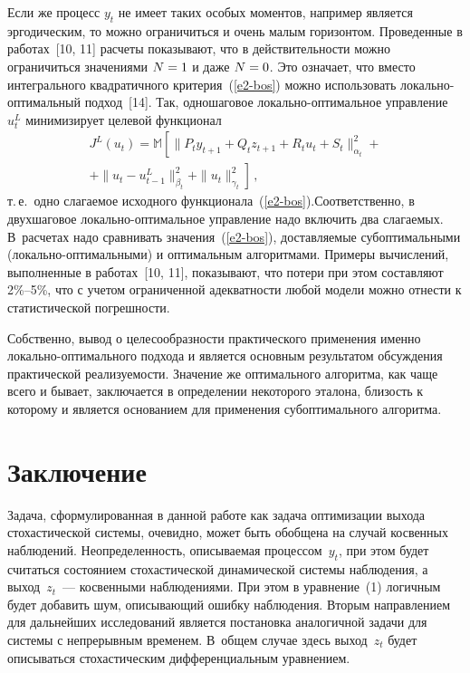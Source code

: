 \begin{multicols}{2}
 Если же процесс $y_t$ не имеет таких особых моментов, например
является эргодическим, то можно ограничиться и очень малым горизонтом.
Проведенные в работах~[10, 11] расчеты показывают, что в действительности
можно ограничиться значениями $N\hm=1$ и даже $N\hm=0$. Это означает,
что вместо интегрального квадратичного критерия~(\ref{e2-bos}) можно
использовать ло\-каль\-но-оп\-ти\-маль\-ный подход~[14]. Так, одношаговое
ло\-каль\-но-оп\-ти\-маль\-ное управление $u_t^L$ минимизирует целевой
функционал
 \begin{multline*}
 J^L(u_t) =\mathbb{M}\left[ \| P_t y_{t+1} +Q_t z_{t+1} +R_t u_t
+S_t\|^2_{\alpha_t} +{}\right.\\[9pt]
\left.{}+\| u_t- u^L_{t-1} \|^2_{\beta_t} +
\| u_t\|^2_{\gamma_t}\right]\,,
\end{multline*}
т.\,е.\ одно слагаемое исходного функционала~(\ref{e2-bos}).\linebreak Соответственно, в
двухшаговое ло\-каль\-но-оп\-ти\-маль\-ное управление надо включить два
сла\-га\-емых. В~расчетах надо сравнивать значения~(\ref{e2-bos}), до\-став\-ля\-емые
субоптимальными (ло\-каль\-но-оп\-ти\-маль\-ными) и оптимальным алгоритмами.
Примеры вы\-чис\-лений, выполненные в работах~[10, 11], показывают, что
потери при этом составляют 2\%--5\%, что с учетом ограниченной адекватности
любой модели можно отнести к статистической погрешности.

 Собственно, вывод о целесообразности практического применения
именно ло\-каль\-но-оп\-ти\-маль\-но\-го подхода и является основным
результатом обсуждения практической реализуемости. Значение же
оптимального алгоритма, как чаще всего и бывает, заключается в определении
некоторого эталона, близость к которому и является основанием для
применения субоптимального алгоритма.

\vspace*{-6pt}

\section{Заключение}

\vspace*{-2pt}

 Задача, сформулированная в данной работе как задача оптимизации
выхода стохастической системы, очевидно, может быть обобщена на случай
косвенных наблюдений. Неопределенность, описываемая процессом~$y_t$, при
этом будет считаться состоянием стохастической динамической системы
наблюдения, а выход~$z_t$~--- косвенными наблюдениями. При этом в
уравнение~(1) логичным будет добавить шум, описывающий ошибку
наблюдения. Вторым направлением для дальнейших исследований является
постановка аналогичной задачи для системы с непрерывным временем.
В~общем случае здесь выход~$z_t$ будет описываться стохастическим
дифференциальным уравнением.




\end{multicols}
